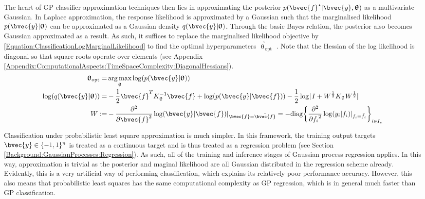 				The heart of GP classifier approximation techniques then lies in approximating the posterior $p(\bvec{f}^{\star} | \bvec{y}, \vec{\uptheta})$ as a multivariate Gaussian. In Laplace approximation, the response likelihood is approximated by a Gaussian such that the marginalised likelihood $p(\bvec{y} | \vec{\uptheta})$ can be approximated as a Gaussian density $q(\bvec{y} | \vec{\uptheta})$. Through the basic Bayes relation, the posterior also becomes Gaussian approximated as a result. As such, it suffices to replace the marginalised likelihood objective by \eqref{Equation:ClassificationLogMarginalLikelihood} to find the optimal hyperparameters $\vec{\uptheta}_{\mathrm{opt}}$ \citep{GaussianProcessForMachineLearning}. Note that the Hessian of the log likelihood is diagonal so that square roots operate over elements (see Appendix \ref{Appendix:ComputationalAspects:TimeSpaceComplexity:DiagonalHessians}). \begin{equation}
					\begin{aligned}
						\vec{\uptheta}_{\mathrm{opt}} =& \argmax_{\vec{\uptheta}} \log(p(\bvec{y} | \vec{\uptheta})) \\
						\log(q(\bvec{y} | \vec{\uptheta})) =& - \frac{1}{2} \bar{\bvec{f}}^{T} K_{\vec{\uptheta}}^{-1} \bar{\bvec{f}} + \log(p(\bvec{y} | \bar{\bvec{f}})) - \frac{1}{2} \log|I + W^{\frac{1}{2}} K_{\vec{\uptheta}} W^{\frac{1}{2}}| \\
						W :=& - \frac{\partial^{2}}{{\partial \bvec{f}}^{2}} \log(\bvec{y} | \bvec{f}) |_{\bvec{f} = \bar{\bvec{f}}} = - \mathrm{diag} \bigg\{  \frac{\partial^{2}}{{\partial f_{i}}^{2}} \log(y_{i} | f_{i}) |_{f_{i} = \bar{f}_{i}} \bigg\}_{i \in I_{n}}
					\end{aligned}
				\label{Equation:ClassificationLogMarginalLikelihood}
				\end{equation}
				
				Classification under probabilistic least square approximation is much simpler. In this framework, the training output targets $\bvec{y} \in \{-1, 1\}^{n}$ is treated as a continuous target and is thus treated as a regression problem (see Section \ref{Background:GaussianProcesses:Regression}). As such, all of the training and inference stages of Gaussian process regression applies. In this way, approximation is trivial as the posterior and maginal likelihood are all Gaussian distributed in the regression scheme already. Evidently, this is a very artificial way of performing classification, which explains its relatively poor performance accuracy. However, this also means that probabilistic least squares has the same computational complexity as GP regression, which is in general much faster than GP classification.
				
